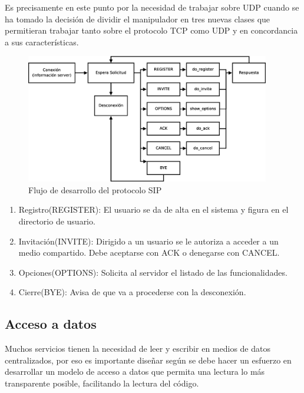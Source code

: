 \documentclass[a4paper,spanish,12pt]{book}
\begin{document}
Es precisamente en este punto por la necesidad de trabajar sobre UDP cuando se ha tomado la decisión de dividir el manipulador en tres nuevas clases que permitieran trabajar tanto sobre el protocolo TCP como UDP y en concordancia a sus características.
\begin{figure}[h]
	\includegraphics[width=0.95\textwidth]{img/DiagramaFlujoSIP.eps}
              \caption{Flujo de desarrollo del protocolo SIP}
  \label{fig:DiagramaFlujoSIP}

\end{figure}

\begin{enumerate}
	\item{Registro(REGISTER): El usuario se da de alta en el sistema y figura en el directorio de usuario.}
	\item{Invitación(INVITE): Dirigido a un usuario se le autoriza a acceder a un medio compartido. Debe aceptarse con ACK o denegarse con CANCEL.}
	\item{Opciones(OPTIONS): Solicita al servidor el listado de las funcionalidades.}
	\item{Cierre(BYE): Avisa de que va a procederse con la desconexión.}
\end{enumerate}


\subsection{Acceso a datos}
Muchos servicios tienen la necesidad de leer y escribir en medios de datos centralizados, por eso es importante diseñar según se debe hacer un esfuerzo en desarrollar un modelo de acceso a datos que permita una lectura lo más transparente posible, facilitando la lectura del código. 
\end{document}
